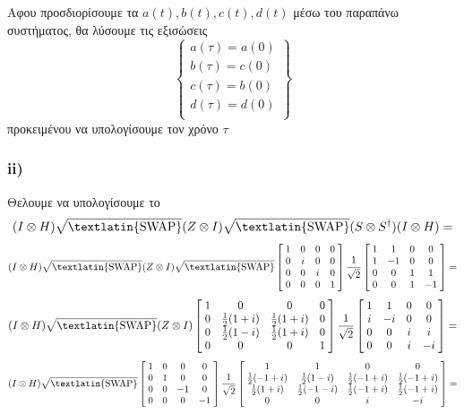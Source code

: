 \documentclass[12pt]{article}
\begin{document}
    Αφου προσδιορίσουμε τα $a(t),b(t),c(t),d(t)$ μέσω του παραπάνω συστήματος, θα λύσουμε τις εξισώσεις
    $$\left\{
    \begin{array}{lr}
        a(\tau) =  a(0)\\
        b(\tau) =  c(0)\\
        c(\tau) =  b(0)\\
        d(\tau) =  d(0)\\
    \end{array}
    \right\} $$ προκειμένου να υπολογίσουμε τον χρόνο $\tau$
\subsubsection*{\textlatin{\bf ii)}}
Θελουμε να υπολογίσουμε το 
$$(I\otimes H )\sqrt{\textnormal{\textlatin{SWAP}}}(Z\otimes I)\sqrt{\textnormal{\textlatin{SWAP}}} (S\otimes S^\dag)(I\otimes H ) =$$
$$(I\otimes H )\sqrt{\textnormal{\textlatin{SWAP}}}(Z\otimes I)\sqrt{\textnormal{\textlatin{SWAP}}}  \begin{bmatrix}
    \;1 & 0& 0& 0 \;\\ 
    \;0 & i& 0& 0\;\\
    \;0 & 0&i& 0\;\\
    \;0 & 0& 0& 1\;
\end{bmatrix}\frac{1}{\sqrt{2}} \begin{bmatrix}
    \;1 & 1& 0& 0 \;\\ 
    \;1 &-1&0& 0\;\\
    \;0 & 0&1& 1\;\\
    \;0 & 0& 1& -1\;
\end{bmatrix} =$$
$$(I\otimes H )\sqrt{\textnormal{\textlatin{SWAP}}}(Z\otimes I) \begin{bmatrix}
    \;1 & 0& 0& 0 \;\\ 
    \;0 & \frac{1}{2}(1+i)& \frac{1}{2}(1+i)& 0\;\\
    \;0 & \frac{1}{2}(1-i)&\frac{1}{2}(1+i)& 0\;\\
    \;0 & 0& 0& 1\;
\end{bmatrix}\frac{1}{\sqrt{2}} \begin{bmatrix}
    \;1 & 1& 0& 0 \;\\ 
    \;i &-i&0& 0\;\\
    \;0 & 0&i& i\;\\
    \;0 & 0& i& -i\;
\end{bmatrix} =$$
$$(I\otimes H )\sqrt{\textnormal{\textlatin{SWAP}}} \begin{bmatrix}
    \;1 & 0& 0& 0 \;\\ 
    \;0 & 1&0& 0\;\\
    \;0 & 0&-1& 0\;\\
    \;0 & 0& 0& -1\;
\end{bmatrix}\frac{1}{\sqrt{2}} \begin{bmatrix}
    \;1 & 1& 0& 0 \;\\ 
    \;\frac{1}{2}(-1+i) & \frac{1}{2}(1-i)& \frac{1}{2}(-1+i)& \frac{1}{2}(-1+i)\;\\
    \;\frac{1}{2}(1+i) & \frac{1}{2}(-1-i)&\frac{1}{2}(-1+i)& \frac{1}{2}(-1+i)\;\\
    \;0 & 0& i& -i\;
\end{bmatrix} =$$
\end{document}

